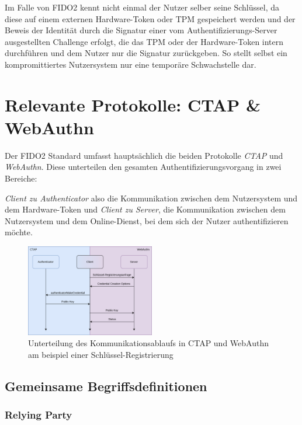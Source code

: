 \documentclass[journal]{IEEEtran}
\begin{document}
Im Falle von FIDO2 kennt nicht einmal der Nutzer selber seine Schlüssel, da
diese auf einem externen Hardware-Token oder TPM gespeichert werden und der
Beweis der Identität durch die Signatur einer vom Authentifizierungs-Server
ausgestellten Challenge erfolgt, die das TPM oder der Hardware-Token intern
durchführen und dem Nutzer nur die Signatur zurückgeben. So stellt selbst ein
kompromittiertes Nutzersystem nur eine temporäre Schwachstelle dar.

\section{Relevante Protokolle: CTAP \& WebAuthn}

Der FIDO2 Standard umfasst hauptsächlich die beiden Protokolle \textit{CTAP}
und \textit{WebAuthn}. Diese unterteilen den gesamten 
Authentifizierungsvorgang in zwei Bereiche:

\textit{Client zu Authenticator} also die Kommunikation zwischen dem
Nutzersystem und dem Hardware-Token und \textit{Client zu Server}, die
Kommunikation zwischen dem Nutzersystem und dem Online-Dienst, bei dem sich der
Nutzer authentifizieren möchte.~\cite{ctapspec, webauthnspec}

\begin{figure}[ht]
	\includegraphics[width=0.5\textwidth]{ctap-webauthn-registration.png}
	\centering
	\caption{Unterteilung des Kommunikationsablaufs in CTAP und WebAuthn am
	beispiel einer Schlüssel-Registrierung}\label{fig:ctap-webauthn}
\end{figure}

\subsection{Gemeinsame Begriffsdefinitionen}

\subsubsection{Relying Party}
\end{document}
